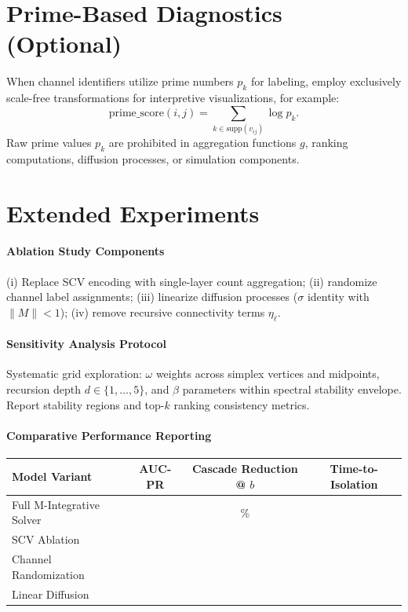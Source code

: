 \documentclass[12pt]{article}
\theoremstyle{plain}
\begin{document}
\section{Prime-Based Diagnostics (Optional)}
\label{app:prime-diag}
When channel identifiers utilize prime numbers $p_k$ for labeling, employ exclusively scale-free transformations for interpretive visualizations, for example:
\[
\text{prime\_score}(i,j)=\sum_{k\in\mathrm{supp}(v_{ij})}\log p_k.
\]
Raw prime values $p_k$ are prohibited in aggregation functions $g$, ranking computations, diffusion processes, or simulation components.

\section{Extended Experiments}
\label{app:extended-expts}
\paragraph{Ablation Study Components}
(i) Replace SCV encoding with single-layer count aggregation; (ii) randomize channel label assignments; (iii) linearize diffusion processes ($\sigma$ identity with $\|M\|<1$); (iv) remove recursive connectivity terms $\eta_\ell$.

\paragraph{Sensitivity Analysis Protocol}
Systematic grid exploration: $\omega$ weights across simplex vertices and midpoints, recursion depth $d\in\{1,\dots,5\}$, and $\beta$ parameters within spectral stability envelope. Report stability regions and top-$k$ ranking consistency metrics.

\paragraph{Comparative Performance Reporting}
\begin{center}
\small
\begin{tabular}{lccc}
\toprule
\textbf{Model Variant} & \textbf{AUC-PR} & \textbf{Cascade Reduction @ $b$} & \textbf{Time-to-Isolation} \\
\midrule
Full M-Integrative Solver & \phantom{00.00} & \phantom{00.0}\% & \phantom{00.0} \\
SCV Ablation &  &  &  \\
Channel Randomization &  &  &  \\
Linear Diffusion &  &  &  \\
\bottomrule
\end{tabular}
\end{center}
\end{document}
